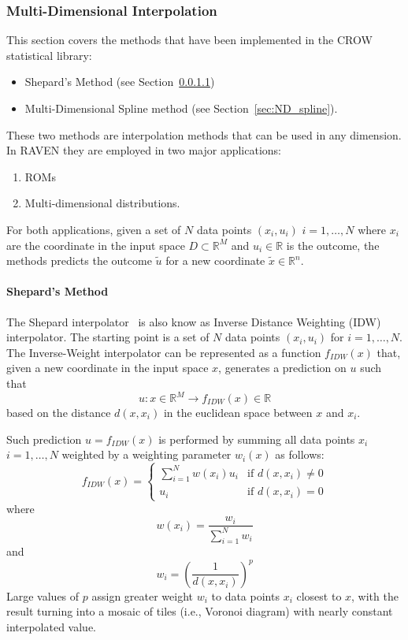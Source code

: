 \subsubsection{Multi-Dimensional Interpolation}
\label{sec:ND_interp}
This section covers the methods that have been implemented in the CROW statistical library:
\begin{itemize}
\item Shepard's Method (see Section~\ref{sec:shepard})
\item Multi-Dimensional Spline method (see Section~\ref{sec:ND_spline}).
\end{itemize}

These two methods are interpolation methods that can be used in any dimension.
In RAVEN they are employed in two major applications:
\begin{enumerate}
\item ROMs
\item Multi-dimensional distributions.
\end{enumerate}
For both applications, given a set of $N$ data points $ (x_i,u_i )$  $i=1,\ldots,N$ where $x_i$ are the coordinate in the input space $D \subset \mathbb{R}^M$ and $u_i \in \mathbb{R}$ is the outcome, the methods predicts the outcome $\tilde{u}$ for a new coordinate $\tilde{x}\in \mathbb{R}^n$.


\paragraph{Shepard's Method}
\label{sec:shepard}
The Shepard interpolator~\cite{Shepard} is also know as Inverse Distance Weighting (IDW) interpolator.
The starting point is a set of $N$ data points $ (x_i,u_i )$ for $i=1,\ldots,N$.
The Inverse-Weight interpolator can be represented as a function $f_{IDW}(x)$ that, given a new coordinate in the input space $x$, generates a prediction on $u$ such that
\begin{equation}
u:x \in \mathbb{R}^M \rightarrow f_{IDW}(x) \in \mathbb{R}
\end{equation}
based on the distance $d(x,x_i)$ in the euclidean space between $x$ and $x_i$.

Such prediction $u=f_{IDW}(x)$ is performed by summing all data points $x_i$ $i=1,\ldots,N$ weighted by a weighting parameter $w_i (x)$ as follows:
\begin{equation}
f_{IDW}(x) =
\left\{
\begin{matrix}
\sum_{i=1}^{N} w(x_i) u_i &  \text{if } d(x,x_i) \neq 0 \\
 u_i &  \text{if } d(x,x_i) = 0
\end{matrix}\right.
\end{equation}
where
\begin{equation}
w(x_i) =\frac{w_i}{\sum_{i=1}^{N} w_i}
\end{equation}
and
\begin{equation}
w_i = \left ( \frac{1}{d(x,x_i)} \right )^p
\end{equation}
Large values of $p$ assign greater weight $w_i$ to data points $x_i$ closest to $x$, with the result turning into a mosaic of tiles (i.e., Voronoi diagram) with nearly constant interpolated value.

